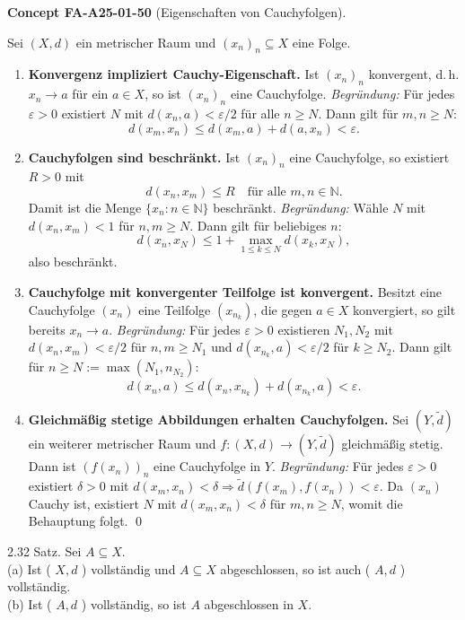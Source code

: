 \documentclass[10pt, letterpaper]{article}
\newcommand{\CustomHeading}[3]{%
  \par\medskip\noindent%
  \textbf{#1 #2} \textnormal{(#3)}.\enskip%
}
\newenvironment{CONC}[2]{\begin{unitbox}\CustomHeading{Concept}{#1}{#2}}{\end{unitbox}}
\begin{document}
\begin{CONC}{FA-A25-01-50}{Eigenschaften von Cauchyfolgen}
Sei $(X,d)$ ein metrischer Raum und $\left(x_{n}\right)_{n}\subseteq X$ eine Folge.
\begin{enumerate}
\item[(a)] \textbf{Konvergenz impliziert Cauchy-Eigenschaft.}  
Ist $\left(x_{n}\right)_{n}$ konvergent, d.\,h. $x_{n}\to a$ für ein $a\in X$, so ist $\left(x_{n}\right)_{n}$ eine Cauchyfolge.  
\emph{Begründung:} Für jedes $\varepsilon>0$ existiert $N$ mit $d(x_n,a)<\varepsilon/2$ für alle $n\ge N$. Dann gilt für $m,n\ge N$:
\[
d(x_m,x_n)\le d(x_m,a)+d(a,x_n)<\varepsilon.
\]

\item[(b)] \textbf{Cauchyfolgen sind beschränkt.}  
Ist $\left(x_{n}\right)_{n}$ eine Cauchyfolge, so existiert $R>0$ mit 
\[
d(x_n,x_m)\le R \quad\text{für alle }m,n\in\mathbb{N}.
\]
Damit ist die Menge $\{x_n : n\in\mathbb{N}\}$ beschränkt.  
\emph{Begründung:} Wähle $N$ mit $d(x_n,x_m)<1$ für $n,m\ge N$. Dann gilt für beliebiges $n$:  
\[
d(x_n,x_N)\le 1+\max_{1\le k\le N}d(x_k,x_N),
\]
also beschränkt.

\item[(c)] \textbf{Cauchyfolge mit konvergenter Teilfolge ist konvergent.}  
Besitzt eine Cauchyfolge $(x_n)$ eine Teilfolge $(x_{n_k})$, die gegen $a\in X$ konvergiert, so gilt bereits $x_n\to a$.  
\emph{Begründung:} Für jedes $\varepsilon>0$ existieren $N_1,N_2$ mit  
$d(x_n,x_m)<\varepsilon/2$ für $n,m\ge N_1$ und $d(x_{n_k},a)<\varepsilon/2$ für $k\ge N_2$.  
Dann gilt für $n\ge N:=\max(N_1,n_{N_2})$:  
\[
d(x_n,a)\le d(x_n,x_{n_k})+d(x_{n_k},a)<\varepsilon.
\]

\item[(d)] \textbf{Gleichmäßig stetige Abbildungen erhalten Cauchyfolgen.}  
Sei $(Y,\tilde d)$ ein weiterer metrischer Raum und $f:(X,d)\to(Y,\tilde d)$ gleichmäßig stetig.  
Dann ist $(f(x_n))_n$ eine Cauchyfolge in $Y$.  
\emph{Begründung:} Für jedes $\varepsilon>0$ existiert $\delta>0$ mit  
$d(x_m,x_n)<\delta\Rightarrow \tilde d(f(x_m),f(x_n))<\varepsilon$.  
Da $(x_n)$ Cauchy ist, existiert $N$ mit $d(x_m,x_n)<\delta$ für $m,n\ge N$, womit die Behauptung folgt. \qed
\end{enumerate}
\end{CONC}


2.32 Satz. Sei $A \subseteq X$.\\
(a) Ist ( $X, d$ ) vollständig und $A \subseteq X$ abgeschlossen, so ist auch ( $A, d$ ) vollständig.\\
(b) Ist ( $A, d$ ) vollständig, so ist $A$ abgeschlossen in $X$.
\end{document}
